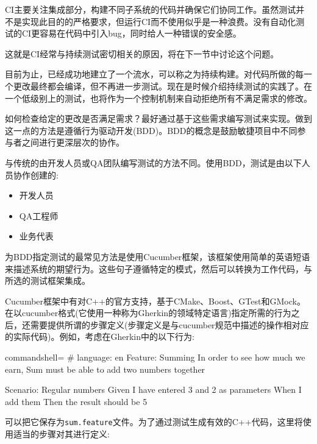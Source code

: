 
CI主要关注集成部分，构建不同子系统的代码并确保它们协同工作。虽然测试并不是实现此目的的严格要求，但运行CI而不使用似乎是一种浪费。没有自动化测试的CI更容易在代码中引入bug，同时给人一种错误的安全感。

这就是CI经常与持续测试密切相关的原因，将在下一节中讨论这个问题。


目前为止，已经成功地建立了一个流水，可以称之为持续构建。对代码所做的每一个更改最终都会编译，但不再进一步测试。现在是时候介绍持续测试的实践了。在一个低级别上的测试，也将作为一个控制机制来自动拒绝所有不满足需求的修改。

如何检查给定的更改是否满足需求？最好通过基于这些需求编写测试来实现。做到这一点的方法是遵循行为驱动开发(BDD)。BDD的概念是鼓励敏捷项目中不同参与者之间进行更深层次的协作。

与传统的由开发人员或QA团队编写测试的方法不同。使用BDD，测试是由以下人员协作创建的:

\begin{itemize}
\item 
开发人员

\item 
QA工程师

\item 
业务代表
\end{itemize}

为BDD指定测试的最常见方法是使用Cucumber框架，该框架使用简单的英语短语来描述系统的期望行为。这些句子遵循特定的模式，然后可以转换为工作代码，与所选的测试框架集成。

Cucumber框架中有对C++的官方支持，基于CMake、Boost、GTest和GMock。在以cucumber格式(它使用一种称为Gherkin的领域特定语言)指定所需的行为之后，还需要提供所谓的步骤定义(步骤定义是与cucumber规范中描述的操作相对应的实际代码)。例如，考虑在Gherkin中的以下行为:

\begin{tcblisting}{commandshell={}}
# language: en
Feature: Summing
In order to see how much we earn,
Sum must be able to add two numbers together

Scenario: Regular numbers
  Given I have entered 3 and 2 as parameters
  When I add them
  Then the result should be 5
\end{tcblisting}

可以把它保存为\texttt{sum.feature}文件。为了通过测试生成有效的C++代码，这里将使用适当的步骤对其进行定义:

